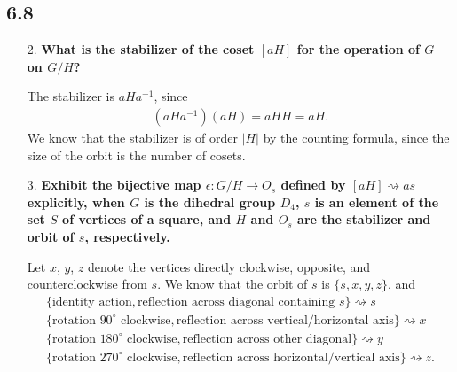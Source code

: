 \documentclass[a4paper,12pt]{article}
\begin{document}
\subsection*{6.8}
\begin{enumerate}
    \item[2.]
        \boldmath
        \textbf{What is the stabilizer of the coset $[aH]$ for the operation of $G$ on $G/H$?} \par
        \unboldmath
        The stabilizer is $aHa^{-1}$, since
        \begin{align*}
            (aHa^{-1})(aH) = aHH = aH.
        \end{align*}
        We know that the stabilizer is of order $|H|$ by the counting formula, since the size of the orbit is the number of cosets.

    \item[3.]
        \boldmath
        \textbf{Exhibit the bijective map $\epsilon : G/H \to O_s$ defined by $[aH] \rightsquigarrow as$ explicitly, when $G$ is the dihedral group $D_4$, $s$ is an element of the set $S$ of vertices of a square, and $H$ and $O_s$ are the stabilizer and orbit of $s$, respectively.} \par
        \unboldmath
        Let $x$, $y$, $z$ denote the vertices directly clockwise, opposite, and counterclockwise from $s$. We know that the orbit of $s$ is $\{ s, x, y, z\}$, and
        \begin{gather*}
            \{ \text{identity action}, \text{reflection across diagonal containing } s\} \rightsquigarrow s \\
            \{ \text{rotation } 90^\circ \text{ clockwise}, \text{reflection across vertical/horizontal axis} \} \rightsquigarrow x \\
            \{ \text{rotation } 180^\circ \text{ clockwise}, \text{reflection across other diagonal} \} \rightsquigarrow y \\
            \{ \text{rotation } 270^\circ \text{ clockwise}, \text{reflection across horizontal/vertical axis} \} \rightsquigarrow z.
        \end{gather*}
\end{enumerate}
\end{document}
